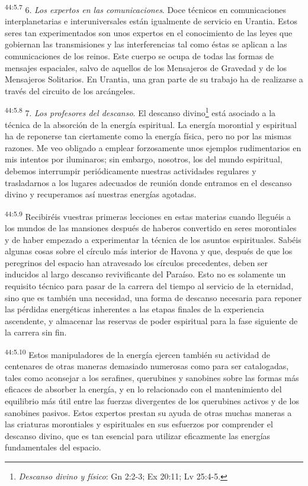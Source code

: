 \par
\textsuperscript{44:5.7} 6. \textit{Los expertos en las comunicaciones}. Doce técnicos en comunicaciones interplanetarias e interuniversales están igualmente de servicio en Urantia. Estos seres tan experimentados son unos expertos en el conocimiento de las leyes que gobiernan las transmisiones y las interferencias tal como éstas se aplican a las comunicaciones de los reinos. Este cuerpo se ocupa de todas las formas de mensajes espaciales, salvo de aquellos de los Mensajeros de Gravedad y de los Mensajeros Solitarios. En Urantia, una gran parte de su trabajo ha de realizarse a través del circuito de los arcángeles.

\par
\textsuperscript{44:5.8} 7. \textit{Los profesores del descanso}. El descanso divino\footnote{\textit{Descanso divino y físico}: Gn 2:2-3; Ex 20:11; Lv 25:4-5.} está asociado a la técnica de la absorción de la energía espiritual. La energía morontial y espiritual ha de reponerse tan ciertamente como la energía física, pero no por las mismas razones. Me veo obligado a emplear forzosamente unos ejemplos rudimentarios en mis intentos por iluminaros; sin embargo, nosotros, los del mundo espiritual, debemos interrumpir periódicamente nuestras actividades regulares y trasladarnos a los lugares adecuados de reunión donde entramos en el descanso divino y recuperamos así nuestras energías agotadas.

\par
\textsuperscript{44:5.9} Recibiréis vuestras primeras lecciones en estas materias cuando lleguéis a los mundos de las mansiones después de haberos convertido en seres morontiales y de haber empezado a experimentar la técnica de los asuntos espirituales. Sabéis algunas cosas sobre el círculo más interior de Havona y que, después de que los peregrinos del espacio han atravesado los círculos precedentes, deben ser inducidos al largo descanso revivificante del Paraíso. Esto no es solamente un requisito técnico para pasar de la carrera del tiempo al servicio de la eternidad, sino que es también una necesidad, una forma de descanso necesaria para reponer las pérdidas energéticas inherentes a las etapas finales de la experiencia ascendente, y almacenar las reservas de poder espiritual para la fase siguiente de la carrera sin fin.

\par
\textsuperscript{44:5.10} Estos manipuladores de la energía ejercen también su actividad de centenares de otras maneras demasiado numerosas como para ser catalogadas, tales como aconsejar a los serafines, querubines y sanobines sobre las formas más eficaces de absorber la energía, y en lo relacionado con el mantenimiento del equilibrio más útil entre las fuerzas divergentes de los querubines activos y de los sanobines pasivos. Estos expertos prestan su ayuda de otras muchas maneras a las criaturas morontiales y espirituales en sus esfuerzos por comprender el descanso divino, que es tan esencial para utilizar eficazmente las energías fundamentales del espacio.

